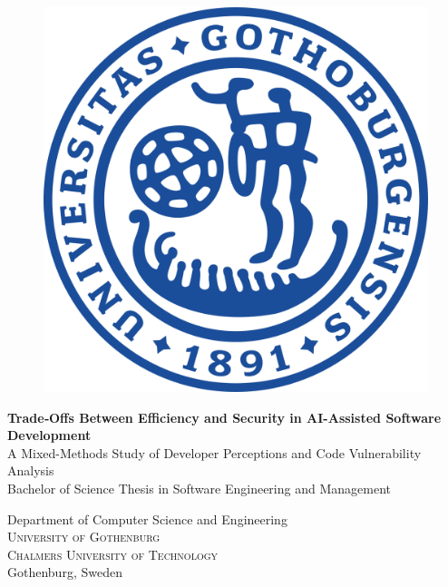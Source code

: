 \documentclass[12pt,a4paper,twoside,openright]{report}
\newcommand{\backgroundpic}[3]{
	\put(#1,#2){
	\parbox[b][\paperheight]{\paperwidth}{
	\centering
	\texttt{[image: \#3]}}}}
\begin{document}
 

\begin{titlepage}
			
\AddToShipoutPicture*{\backgroundpic{-4}{56.7}{frontpage_gu_eng_vec_m2.pdf}}
\addtolength{\voffset}{2cm}

\begin{figure}[H]
\centering
\vspace{1cm}
\includegraphics[width=0.6\linewidth, height=0.4\textheight]{greybox.png}
\end{figure}

\mbox{}
\vfill
\renewcommand{\familydefault}{\sfdefault} \normalfont %

\textbf{\Huge Trade‐Offs Between Efficiency and Security in AI-Assisted Software Development} 
\\[0.5cm]

{\Large A Mixed-Methods Study of Developer Perceptions and Code Vulnerability Analysis}\\[0.5cm]

Bachelor of Science Thesis in Software Engineering and Management \setlength{\parskip}{1cm}


Department of Computer Science and Engineering \\
\textsc{University of Gothenburg} \\
\textsc{Chalmers University of Technology} \\
Gothenburg, Sweden \the\year

\renewcommand{\familydefault}{\rmdefault} \normalfont %
\end{titlepage}
\end{document}
